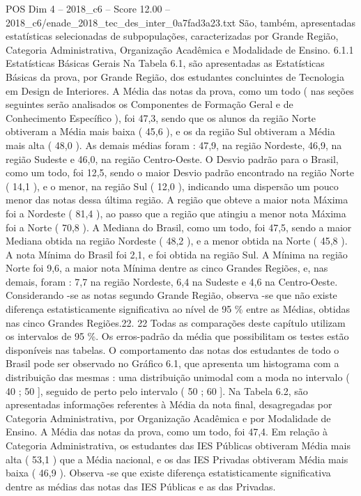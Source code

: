 \begin{textsample}{POS Dim 4 – 2018\_c6 – Score 12.00 – 2018\_c6/enade\_2018\_tec\_des\_inter\_0a7fad3a23.txt}
São, também, apresentadas estatísticas selecionadas de subpopulações, caracterizadas por Grande Região, Categoria Administrativa, Organização Acadêmica e Modalidade de Ensino. 6.1.1 Estatísticas Básicas Gerais Na Tabela 6.1, são apresentadas as Estatísticas Básicas da prova, por Grande Região, dos estudantes concluintes de Tecnologia em Design de Interiores.
A Média das notas da prova, como um todo ( nas seções seguintes serão analisados os Componentes de Formação Geral e de Conhecimento Específico ), foi 47,3, sendo que os alunos da região Norte obtiveram a Média mais baixa ( 45,6 ), e os da região Sul obtiveram a Média mais alta ( 48,0 ).
As demais médias foram : 47,9, na região Nordeste, 46,9, na região Sudeste e 46,0, na região Centro-Oeste.
O Desvio padrão para o Brasil, como um todo, foi 12,5, sendo o maior Desvio padrão encontrado na região Norte ( 14,1 ), e o menor, na região Sul ( 12,0 ), indicando uma dispersão um pouco menor das notas dessa última região.
A região que obteve a maior nota Máxima foi a Nordeste ( 81,4 ), ao passo que a região que atingiu a menor nota Máxima foi a Norte ( 70,8 ).
A Mediana do Brasil, como um todo, foi 47,5, sendo a maior Mediana obtida na região Nordeste ( 48,2 ), e a menor obtida na Norte ( 45,8 ).
A nota Mínima do Brasil foi 2,1, e foi obtida na região Sul.
A Mínima na região Norte foi 9,6, a maior nota Mínima dentre as cinco Grandes Regiões, e, nas demais, foram : 7,7 na região Nordeste, 6,4 na Sudeste e 4,6 na Centro-Oeste.
Considerando -se as notas segundo Grande Região, observa -se que não existe diferença estatisticamente significativa ao nível de 95 \% entre as Médias, obtidas nas cinco Grandes Regiões.22. 22 Todas as comparações deste capítulo utilizam os intervalos de 95 \%.
Os erros-padrão da média que possibilitam os testes estão disponíveis nas tabelas.
O comportamento das notas dos estudantes de todo o Brasil pode ser observado no Gráfico 6.1, que apresenta um histograma com a distribuição das mesmas : uma distribuição unimodal com a moda no intervalo ( 40 ; 50 ], seguido de perto pelo intervalo ( 50 ; 60 ].
Na Tabela 6.2, são apresentadas informações referentes à Média da nota final, desagregadas por Categoria Administrativa, por Organização Acadêmica e por Modalidade de Ensino.
A Média das notas da prova, como um todo, foi 47,4.
Em relação à Categoria Administrativa, os estudantes das IES Públicas obtiveram Média mais alta ( 53,1 ) que a Média nacional, e os das IES Privadas obtiveram Média mais baixa ( 46,9 ).
Observa -se que existe diferença estatisticamente significativa dentre as médias das notas das IES Públicas e as das Privadas.

\end{textsample}

